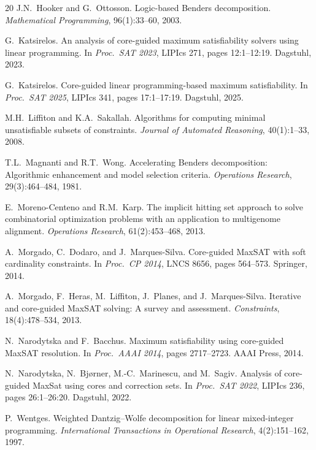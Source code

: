 \documentclass[11pt,a4paper]{article}
\begin{document}
\begin{thebibliography}{20}
J.N.~Hooker and G.~Ottosson.
\newblock Logic-based {B}enders decomposition.
\newblock \emph{Mathematical Programming}, 96(1):33--60, 2003.

G.~Katsirelos.
\newblock An analysis of core-guided maximum satisfiability solvers using linear
  programming.
\newblock In \emph{Proc.\ SAT 2023}, LIPIcs 271, pages 12:1--12:19. Dagstuhl, 2023.

G.~Katsirelos.
\newblock Core-guided linear programming-based maximum satisfiability.
\newblock In \emph{Proc.\ SAT 2025}, LIPIcs 341, pages 17:1--17:19. Dagstuhl, 2025.

M.H.~Liffiton and K.A.~Sakallah.
\newblock Algorithms for computing minimal unsatisfiable subsets of constraints.
\newblock \emph{Journal of Automated Reasoning}, 40(1):1--33, 2008.

T.L.~Magnanti and R.T.~Wong.
\newblock Accelerating {B}enders decomposition: Algorithmic enhancement and
  model selection criteria.
\newblock \emph{Operations Research}, 29(3):464--484, 1981.

E.~Moreno-Centeno and R.M.~Karp.
\newblock The implicit hitting set approach to solve combinatorial optimization
  problems with an application to multigenome alignment.
\newblock \emph{Operations Research}, 61(2):453--468, 2013.

A.~Morgado, C.~Dodaro, and J.~Marques-Silva.
\newblock Core-guided {MaxSAT} with soft cardinality constraints.
\newblock In \emph{Proc.\ CP 2014}, LNCS 8656, pages 564--573. Springer, 2014.

A.~Morgado, F.~Heras, M.~Liffiton, J.~Planes, and J.~Marques-Silva.
\newblock Iterative and core-guided {MaxSAT} solving: A survey and assessment.
\newblock \emph{Constraints}, 18(4):478--534, 2013.

N.~Narodytska and F.~Bacchus.
\newblock Maximum satisfiability using core-guided {MaxSAT} resolution.
\newblock In \emph{Proc.\ AAAI 2014}, pages 2717--2723. AAAI Press, 2014.

N.~Narodytska, N.~Bj{\o}rner, M.-C.~Marinescu, and M.~Sagiv.
\newblock Analysis of core-guided {MaxSat} using cores and correction sets.
\newblock In \emph{Proc.\ SAT 2022}, LIPIcs 236, pages 26:1--26:20. Dagstuhl, 2022.

P.~Wentges.
\newblock Weighted {D}antzig--{W}olfe decomposition for linear mixed-integer
  programming.
\newblock \emph{International Transactions in Operational Research},
  4(2):151--162, 1997.

\end{thebibliography}
\end{document}
